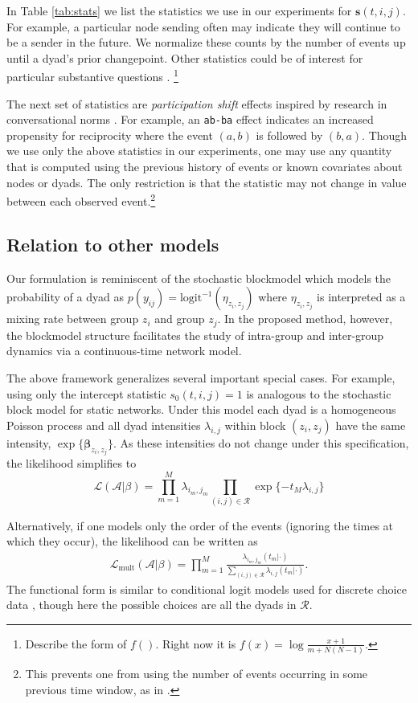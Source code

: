 In Table \ref{tab:stats} we list the statistics we use in our experiments for  $\mathbf{s}(t,i,j)$.
For example, a particular node sending often may indicate they will continue to be a sender in the future.
We normalize these counts by the number of events up until a dyad's prior changepoint.%
Other statistics could be of interest for particular substantive questions \cite{Butts2008,Vu2011}.  \footnote{Describe the form of $f()$.  Right now it is $f(x) = \log \frac{x+1}{m + N(N-1)}$.}

The next set of statistics are \emph{participation shift} effects inspired by research in conversational norms \cite{Gibson2003}.
For example, an \texttt{ab-ba} effect indicates an increased propensity for reciprocity where the event $(a,b)$ is followed by $(b,a)$.
Though we use only the above statistics in our experiments, one may use any quantity that is computed using the previous history of events or known covariates about nodes or dyads.
The only restriction is that the statistic may not change in value between each observed event.\footnote{This prevents one from using the number of events occurring in some previous time window, as in \cite{Gunawardana2011}.}

\subsection{Relation to other models}

Our formulation is reminiscent of the stochastic blockmodel \cite{Nowicki2001,Kemp} which models the probability of a dyad as $p(y_{ij}) =\mbox{logit}^{-1}( \eta_{z_i,z_j})$ where $\eta_{z_i,z_j}$ is interpreted as a mixing rate between group $z_i$ and group $z_j$.
In the proposed method, however, the blockmodel structure facilitates the study of intra-group and inter-group dynamics via a continuous-time network model.

The above framework generalizes several important special cases.
For example,  using only the intercept statistic $s_0(t,i,j) = 1$ is analogous to the stochastic block model for static networks.
Under this model each dyad is a homogeneous Poisson process and all dyad intensities $\lambda_{i,j}$ within block $(z_i,z_j)$ have the same intensity, $\exp\{\boldsymbol{\beta}_{z_i,z_j}\}$.
As these intensities do not change under this specification, the likelihood simplifies to
$$\mathcal{L}(\mathcal{A}|\beta) = \prod_{m=1}^M \lambda_{i_m,j_m} \prod_{(i,j) \in \mathcal{R}} \exp\{-t_M \lambda_{i,j}\}$$

Alternatively, if one models only the order of the events (ignoring the times at which they occur), the likelihood can be written as
\begin{align}
\mathcal{L}_{\mbox{mult}}(\mathcal{A}|\beta) = \prod_{m=1}^M \frac{\lambda_{i_m,j_m}(t_m | \cdot)}{\sum_{(i,j) \in \mathcal{R}} \lambda_{i,j}(t_m | \cdot)}.
\label{eqn:multllk}
\end{align}
The functional form is similar to conditional logit models used for discrete choice data \cite{McFadden1984}, though here the possible choices are all the dyads in $\mathcal{R}$.


